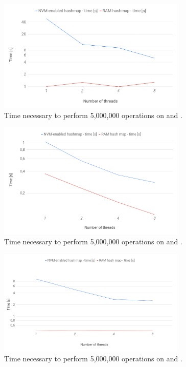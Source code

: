     \begin{figure}[ht]
        \centering
        \includegraphics[width=0.8\textwidth]{thesis/figures/insert.png}
        \caption{Time necessary to perform 5,000,000 \insertMethod operations on \PHT and \StandardHashMap.}
        \label{insertPlot}
    \end{figure}
    
    \begin{figure}[ht]
        \centering
        \includegraphics[width=0.8\textwidth]{thesis/figures/get.png}
        \caption{Time necessary to perform 5,000,000 \getMethod operations on \PHT and \StandardHashMap.}
        \label{getPlot}
    \end{figure}
    
    \begin{figure}[ht]
        \centering
        \includegraphics[width=0.8\textwidth]{thesis/figures/remove.png}
        \caption{Time necessary to perform 5,000,000 \removeMethod operations on \PHT and \StandardHashMap.}
        \label{removePlot}
    \end{figure}
    
